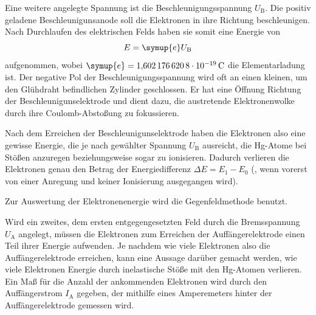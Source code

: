 Eine weitere angelegte Spannung ist die Beschleunigungsspannung $U_\text{B}$. 
Die positiv geladene Beschleunigunsanode soll die Elektronen in ihre Richtung beschleunigen.
Nach Durchlaufen des elektrischen Felds haben sie somit eine Energie von 
\begin{equation*}
    E=\symup{e}U_\text{B}
\end{equation*}
aufgenommen, wobei $\symup{e}=\SI{1.6021766208e-19}{\coulomb}$ die Elementarladung ist\cite{scipy}. 
Der negative Pol der Beschleunigungsspannung wird oft an einen kleinen, um den Glühdraht befindlichen Zylinder geschlossen. 
Er hat eine Öffnung Richtung der Beschleunigunselektrode und dient dazu, die austretende Elektronenwolke durch ihre 
Coulomb-Abstoßung zu fokussieren.

Nach dem Erreichen der Beschleunigunselektrode haben die Elektronen also eine gewisse Energie, die je nach gewählter Spannung $U_\text{B}$
ausreicht, die Hg-Atome bei Stößen anzuregen beziehungsweise sogar zu ionisieren. Dadurch verlieren die Elektronen 
genau den Betrag der Energiedifferenz $\Delta E=E_1-E_0$ (, wenn vorerst von einer Anregung und keiner Ionisierung ausgegangen wird).

Zur Auswertung der Elektronenenergie wird die Gegenfeldmethode benutzt. 

Wird ein zweites, dem ersten entgegengesetzten Feld durch die Bremsspannung $U_\text{A}$ angelegt, müssen die 
Elektronen zum Erreichen der Auffängerelektrode einen Teil ihrer Energie aufwenden. 
Je nachdem wie viele Elektronen also die Auffängerelektrode erreichen, kann eine Aussage darüber gemacht werden, 
wie viele Elektronen Energie durch inelastische Stöße mit den Hg-Atomen verlieren. 
Ein Maß für die Anzahl der ankommenden Elektronen wird durch den Auffängerstrom $I_\text{A}$ gegeben, der mithilfe eines 
Amperemeters hinter der Auffängerelektrode gemessen wird. 

